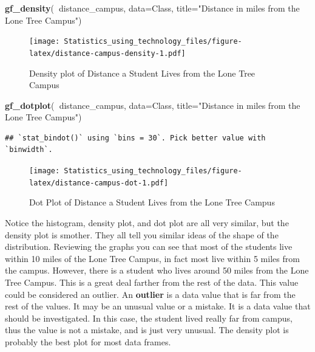 \documentclass[]{book}
\newenvironment{Shaded}{\begin{snugshade}}{\end{snugshade}}
\newcommand{\DataTypeTok}[1]{\textcolor[rgb]{0.13,0.29,0.53}{#1}}
\newcommand{\KeywordTok}[1]{\textcolor[rgb]{0.13,0.29,0.53}{\textbf{#1}}}
\newcommand{\NormalTok}[1]{#1}
\newcommand{\OperatorTok}[1]{\textcolor[rgb]{0.81,0.36,0.00}{\textbf{#1}}}
\newcommand{\StringTok}[1]{\textcolor[rgb]{0.31,0.60,0.02}{#1}}
\begin{document}
\begin{Shaded}
\begin{Highlighting}[]
\KeywordTok{gf_density}\NormalTok{(}\OperatorTok{~}\NormalTok{distance_campus, }\DataTypeTok{data=}\NormalTok{Class, }\DataTypeTok{title=}\StringTok{"Distance in miles from the Lone Tree Campus"}\NormalTok{)}
\end{Highlighting}
\end{Shaded}

\begin{figure}
\centering
\texttt{[image: Statistics\_using\_technology\_files/figure-latex/distance-campus-density-1.pdf]}
\caption{\label{fig:distance-campus-density}Density plot of Distance a Student Lives from the Lone Tree Campus}
\end{figure}



\begin{Shaded}
\begin{Highlighting}[]
\KeywordTok{gf_dotplot}\NormalTok{(}\OperatorTok{~}\NormalTok{distance_campus, }\DataTypeTok{data=}\NormalTok{Class, }\DataTypeTok{title=}\StringTok{"Distance in miles from the Lone Tree Campus"}\NormalTok{)}
\end{Highlighting}
\end{Shaded}

\begin{verbatim}
## `stat_bindot()` using `bins = 30`. Pick better value with `binwidth`.
\end{verbatim}

\begin{figure}
\centering
\texttt{[image: Statistics\_using\_technology\_files/figure-latex/distance-campus-dot-1.pdf]}
\caption{\label{fig:distance-campus-dot}Dot Plot of Distance a Student Lives from the Lone Tree Campus}
\end{figure}

Notice the histogram, density plot, and dot plot are all very similar, but the density plot is smother. They all tell you similar ideas of the shape of the distribution. Reviewing the graphs you can see that most of the students live within 10 miles of the Lone Tree Campus, in fact most live within 5 miles from the campus. However, there is a student who lives around 50 miles from the Lone Tree Campus. This is a great deal farther from the rest of the data. This value could be considered an outlier. An \textbf{outlier} is a data value that is far from the rest of the values. It may be an unusual value or a mistake. It is a data value that should be investigated. In this case, the student lived really far from campus, thus the value is not a mistake, and is just very unusual. The density plot is probably the best plot for most data frames.
\end{document}
